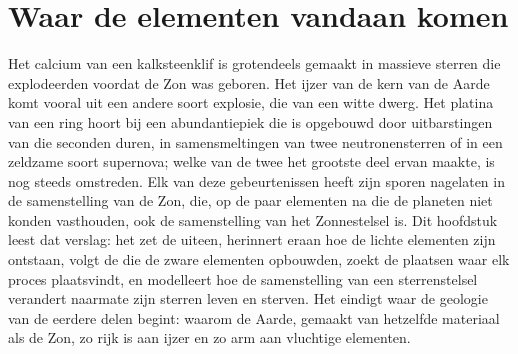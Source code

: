 \chapter{Waar de elementen vandaan komen}\label{ch:b3:origin-of-elements}

Het calcium van een kalksteenklif is grotendeels gemaakt in
massieve sterren die explodeerden voordat de Zon was geboren. Het ijzer van de
kern van de Aarde komt vooral uit een andere soort explosie, die van een
witte dwerg. Het platina van een ring hoort bij een abundantiepiek die is opgebouwd door
uitbarstingen van  die seconden duren, in samensmeltingen van twee neutronensterren
of in een zeldzame soort supernova; welke van de twee het grootste deel ervan maakte, is
nog steeds omstreden.
Elk van deze gebeurtenissen heeft zijn sporen nagelaten in de samenstelling van de Zon,
die, op de paar elementen na die de planeten niet konden vasthouden, ook
de samenstelling van het Zonnestelsel is. Dit hoofdstuk leest dat verslag: het zet de  uiteen,
herinnert eraan hoe de lichte elementen zijn ontstaan, volgt de  die de zware elementen opbouwden, zoekt
de plaatsen waar elk proces plaatsvindt, en modelleert hoe de samenstelling van een
sterrenstelsel verandert naarmate zijn sterren leven en sterven. Het eindigt waar de geologie van
de eerdere delen begint:
waarom de Aarde, gemaakt van hetzelfde materiaal als
de Zon, zo rijk is aan ijzer en zo arm aan vluchtige elementen.

